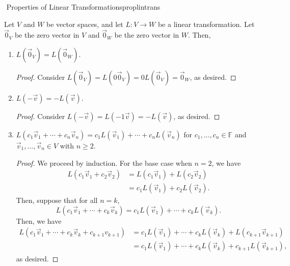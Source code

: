         \begin{theorem}{\Stop\,\,Properties of Linear Transformations}{proplintrans}

            Let \(V\) and \(W\) be vector spaces, and let \(L:V\to W\) be a linear transformation. Let \(\vec{0}_V\) be the zero vector in \(V\) and \(\vec{0}_W\) be the zero vector in \(W\). Then,
            \begin{enumerate}
                \item \(L(\vec{0}_V)=L(\vec{0}_W)\).
                \begin{proof}
                    Consider \(L(\vec{0}_V)=L(0\vec{0}_V)=0L(\vec{0}_V)=\vec{0}_W\), as desired.
                \end{proof}
                \item \(L(-\vec{v})=-L(\vec{v})\).
                \begin{proof}
                    Consider \(L(-\vec{v})=L(-1\vec{v})=-L(\vec{v})\), as desired.
                \end{proof}
                \item \(L(c_1\vec{v}_1+\cdots+c_n\vec{v}_n)=c_1L(\vec{v}_1)+\cdots+c_nL(\vec{v}_n)\) for \(c_1,\ldots,c_n\in\mathbb{F}\) and \(\vec{v}_1,\ldots,\vec{v}_n\in V\) with \(n\geq2\).
                \begin{proof}
                    We proceed by induction. For the base case when \(n=2\), we have
                    \begin{align*}
                        L(c_1\vec{v}_1+c_2\vec{v}_2)&=L(c_1\vec{v}_1)+L(c_2\vec{v}_2) \\
                        &=c_1L(\vec{v}_1)+c_2L(\vec{v}_2).
                    \end{align*}
                    Then, suppose that for all \(n=k\), 
                    \begin{equation*}
                        L(c_1\vec{v}_1+\cdots+c_k\vec{v}_k)=c_1L(\vec{v}_1)+\cdots+c_kL(\vec{v}_k).
                    \end{equation*}
                    Then, we have
                    \begin{align*}
                        L(c_1\vec{v}_1+\cdots+c_k\vec{v}_k+c_{k+1}v_{k+1})&=c_1L(\vec{v}_1)+\cdots+c_kL(\vec{v}_k)+L(c_{k+1}\vec{v}_{k+1}) \\
                        &=c_1L(\vec{v}_1)+\cdots+c_kL(\vec{v}_k)+c_{k+1}L(\vec{v}_{k+1}),
                    \end{align*}
                    as desired.
                \end{proof}
            \end{enumerate}
            
        \end{theorem}
